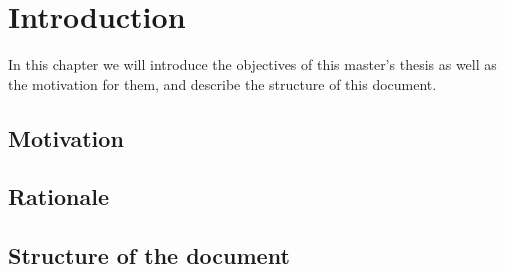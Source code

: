 \chapter{Introduction}

\begin{chapterintro}

In this chapter we will introduce the objectives of this master's thesis as well as the motivation for them, and describe the structure of this document.
 
\end{chapterintro}

\cleardoublepage

\section{Motivation}

\section{Rationale}

\section{Structure of the document}